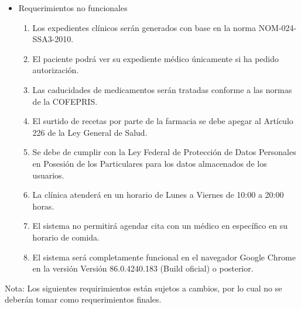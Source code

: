 \documentclass[12pt,letterpaper]{article}
\begin{document}
{{{\begin{itemize}
\begin{enumerate}
                        \item El sistema permitirá al encargado de farmacia realizar cobros por medicamentos.
                        \item El sistema permitirá al encargado de farmacia modificar la existencia de medicamentos en inventario.
                    \end{enumerate}
                    \item Requerimientos no funcionales
                    \begin{enumerate}
                        \item Los expedientes clínicos serán generados con base en la norma NOM-024-SSA3-2010.
                        \item El paciente podrá ver su expediente médico únicamente si ha pedido autorización.
                        \item Las caducidades de medicamentos serán tratadas conforme a las normas de la COFEPRIS.
                        \item El surtido de recetas por parte de la farmacia se debe apegar al Artículo 226 de la Ley General de Salud.
                        \item Se debe de cumplir con la Ley Federal de Protección de Datos Personales en Posesión de los Particulares para los datos almacenados de los usuarios.
                        \item La clínica atenderá en un horario de Lunes a Viernes de 10:00 a 20:00 horas.
                        \item El sistema no permitirá agendar cita con un médico en específico en su horario de comida.
                        \item El sistema será completamente funcional en el navegador Google Chrome en la versión Versión 86.0.4240.183 (Build oficial) o posterior.
                    \end{enumerate}
            \end{itemize}
            Nota: Los siguientes requirimientos están sujetos a cambios, por lo cual no se deberán tomar como requerimientos finales.
			}
		}
	}
\end{document}
